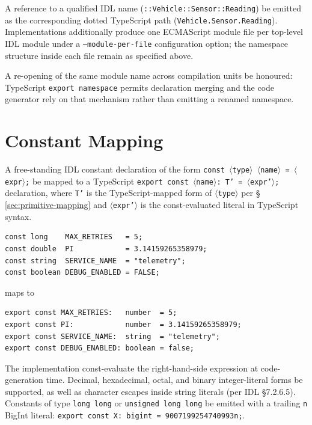 \documentclass{../styles/zerodds-vendor-spec}
\begin{document}
A reference to a qualified IDL name (\texttt{::Vehicle::Sensor::Reading})
 be emitted as the corresponding dotted TypeScript path
(\texttt{Vehicle.Sensor.Reading}). Implementations 
additionally produce one ECMAScript module file per top-level IDL
module under a \texttt{--module-per-file} configuration option; the
namespace structure inside each file  remain as
specified above.

A re-opening of the same module name across compilation units
 be honoured: TypeScript \texttt{export namespace}
permits declaration merging and the code generator 
rely on that mechanism rather than emitting a renamed namespace.

\section{Constant Mapping}\label{sec:constant-mapping}

A free-standing IDL constant declaration of the form
\texttt{const $\langle$type$\rangle$ $\langle$name$\rangle$\,=\,$\langle$expr$\rangle$;}
 be mapped to a TypeScript
\texttt{export const $\langle$name$\rangle$:\,T'\,=\,$\langle$expr'$\rangle$;}
declaration, where \texttt{T'} is the TypeScript-mapped form of
\texttt{$\langle$type$\rangle$} per
\S\,\ref{sec:primitive-mapping} and \texttt{$\langle$expr'$\rangle$}
is the const-evaluated literal in TypeScript syntax.

\begin{specexample}
\begin{lstlisting}
const long    MAX_RETRIES   = 5;
const double  PI            = 3.14159265358979;
const string  SERVICE_NAME  = "telemetry";
const boolean DEBUG_ENABLED = FALSE;
\end{lstlisting}
maps to
\begin{lstlisting}
export const MAX_RETRIES:   number  = 5;
export const PI:            number  = 3.14159265358979;
export const SERVICE_NAME:  string  = "telemetry";
export const DEBUG_ENABLED: boolean = false;
\end{lstlisting}
\end{specexample}

The implementation  const-evaluate the right-hand-side
expression at code-generation time. Decimal, hexadecimal, octal, and
binary integer-literal forms  be supported, as well as
character escapes inside string literals (per IDL §7.2.6.5).
Constants of type \texttt{long long} or \texttt{unsigned long long}
 be emitted with a trailing \texttt{n} BigInt literal:
\texttt{export const X: bigint = 9007199254740993n;}.
\end{document}

